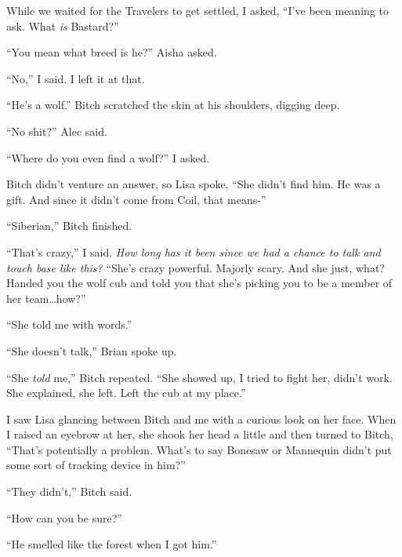 While we waited for the Travelers to get settled, I asked, ``I've been meaning to ask.  What \emph{is} Bastard?''



``You mean what breed is he?'' Aisha asked.



``No,'' I said.  I left it at that.



``He's a wolf.''  Bitch scratched the skin at his shoulders, digging deep.



``No shit?'' Alec said.



``Where do you even find a wolf?'' I asked.



Bitch didn't venture an answer, so Lisa spoke, ``She didn't find him.  He was a gift.  And since it didn't come from Coil, that means-''



``Siberian,'' Bitch finished.



``That's crazy,'' I said.  \emph{How long has it been since we had a chance to talk and touch base like this?}  ``She's crazy powerful.  Majorly scary.  And she just, what?  Handed you the wolf cub and told you that she's picking you to be a member of her team\ldots how?''



``She told me with words.''



``She doesn't talk,'' Brian spoke up.



``She \emph{told} me,'' Bitch repeated.  ``She showed up, I tried to fight her, didn't work.  She explained, she left.  Left the cub at my place.''



I saw Lisa glancing between Bitch and me with a curious look on her face.  When I raised an eyebrow at her, she shook her head a little and then turned to Bitch, ``That's potentially a problem.  What's to say Bonesaw or Mannequin didn't put some sort of tracking device in him?''



``They didn't,'' Bitch said.



``How can you be sure?''



``He smelled like the forest when I got him.''



